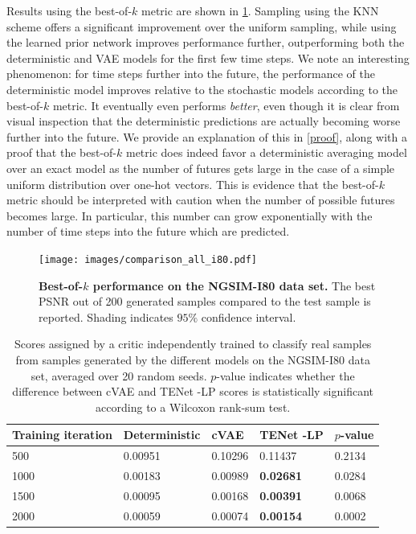 \documentclass{article}
\newcommand{\modelname}{TENet }
\begin{document}
Results using the best-of-$k$ metric are shown in \cref{best-of-k-i80}.
Sampling using the KNN scheme offers a significant improvement over the uniform sampling, while using the learned prior network improves performance further, outperforming both the deterministic and VAE models for the first few time steps.
We note an interesting phenomenon: for time steps further into the future, the performance of the deterministic model improves relative to the stochastic models according to the best-of-$k$ metric.
It eventually even performs \emph{better}, even though it is clear from visual inspection that the deterministic predictions are actually becoming worse further into the future.
We provide an explanation of this in \cref{proof}, along with a proof that the best-of-$k$ metric does indeed favor a deterministic averaging model over an exact model as the number of futures gets large in the case of a simple uniform distribution over one-hot vectors.
This is evidence that the best-of-$k$ metric should be interpreted with caution when the number of possible futures becomes large.
In particular, this number can grow exponentially with the number of time steps into the future which are predicted.

\begin{figure}[t!]
  \centering
  \texttt{[image: images/comparison\_all\_i80.pdf]}
  \caption{
    \textbf{Best-of-$k$ performance on the NGSIM-I80 data set.}
    The best PSNR out of 200 generated samples compared to the test sample is reported.
    Shading indicates $95\%$ confidence interval.
  }
  \label{best-of-k-i80}
\end{figure}

\begin{table}[t!]
  \caption{
    Scores assigned by a critic independently trained to classify real samples from samples generated by the different models on the NGSIM-I80 data set, averaged over 20 random seeds.
$p$-value indicates whether the difference between cVAE and \modelname-LP scores is statistically significant according to a Wilcoxon rank-sum test.
  }
  \label{critic-table}
  \centering
  \begin{tabular}{l|l|lll}
    \toprule
    Training iteration     & Deterministic & cVAE & \modelname-LP & $p$-value \\
    \midrule
    500 & 0.00951 & 0.10296 & 0.11437 & 0.2134 \\
    1000 & 0.00183 & 0.00989 & \textbf{0.02681} & 0.0284 \\
    1500 & 0.00095 & 0.00168 & \textbf{0.00391} & 0.0068 \\
    2000 & 0.00059 & 0.00074 & \textbf{0.00154} & 0.0002 \\
    \bottomrule
  \end{tabular}
\end{table}
\end{document}
